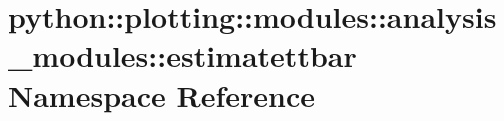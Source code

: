 \hypertarget{namespacepython_1_1plotting_1_1modules_1_1analysis__modules_1_1estimatettbar}{
\section{python::plotting::modules::analysis\_\-modules::estimatettbar Namespace Reference}
\label{namespacepython_1_1plotting_1_1modules_1_1analysis__modules_1_1estimatettbar}
}
